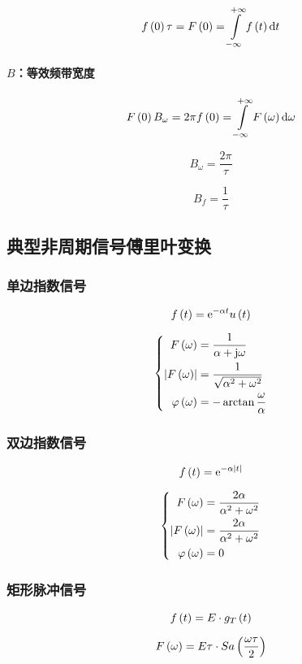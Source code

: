 \documentclass{article}
\begin{document}
\[f\p{0}\tau=F\p{0}=\impint\ft\d t\]

\paragraph{$B$：等效频带宽度}

\[F\p{0}B_\omega=2\pi f\p{0}=\impint \fw\d\omega\]

\[B_\omega=\frac{2\pi}\tau\]

\[B_f=\frac1\tau\]

\subsection{典型非周期信号傅里叶变换}

\subsubsection{单边指数信号}

\[f\left(t\right)=\mathrm e^{-\alpha t}u\left(t\right)\]

\[\left\{\begin{aligned}
        F\left(\omega\right)               & =\frac1{\alpha+\mathrm j\omega}          \\
        \left|F\left(\omega\right)\right|         & =\frac1{\sqrt{\alpha^2+\omega^2}} \\
        \varphi\left(\omega\right) & =-\arctan\frac\omega\alpha
    \end{aligned}\right.\]

\subsubsection{双边指数信号}

\[f\left(t\right)=\mathrm e^{-\alpha\left|t\right|}\]

\[\left\{\begin{aligned}
        F\left(\omega\right)               & =\frac{2\alpha}{\alpha^2+\omega^2} \\
        \left|F\left(\omega\right)\right|         & =\frac{2\alpha}{\alpha^2+\omega^2} \\
        \varphi\left(\omega\right) & =0
    \end{aligned}\right.\]

\subsubsection{矩形脉冲信号}

\[f\left(t\right)=E\cdot g_T\left(t\right)\]

\[F\left(\omega\right)=E\tau\cdot Sa\left(\frac{\omega\tau}2\right)\]
\end{document}
